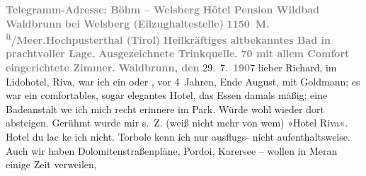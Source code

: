 \begin{ledgroupsized}[t]{13cm}
           \noindent{}{\pb}\textcolor{gray}{\textbf{Telegramm-Adresse: Böhm – Welsberg}}\pend
           \pstart
           \textcolor{gray}{\textbf{Hôtel {\kaufmannsund} Pension Wildbad Waldbrunn}}\pend
           \pstart
           \textcolor{gray}{\textbf{bei Welsberg
                     (Eilzughaltestelle)}}\pend
           \pstart
           \textcolor{gray}{\textbf{1150 M. \textsuperscript{ü}/Meer.\hspace*{1.5em}Hochpusterthal (Tirol)}}\pend
           \pstart
           \textcolor{gray}{\textbf{Heilkräftiges altbekanntes Bad in prachtvoller Lage.}}\pend
           \pstart
           \textcolor{gray}{\textbf{Ausgezeichnete Trinkquelle.}}\pend
           \pstart
           \textcolor{gray}{\textbf{70 mit allem Comfort eingerichtete Zimmer.}}\pend
           \pstart
           \raggedleft{}\textcolor{gray}{\textbf{Waldbrunn, den}}{ }29. 7. \textcolor{gray}{\textbf{190}}7\pend
           \pstart{}lieber Richard,\pend\pstart
           im Lidohotel, Riva, war ich ein oder \label{K_L01695_1v}\label{K_L01695_1h}, vor 4 Jahren, Ende August, mit Goldmann; es war ein comfortables, sogar elegantes Hotel, das Essen damals
               mäßig; eine Badeanstalt we{\geminationn} ich mich recht erinnere im
               Park. Würde wohl wieder dort absteigen. Gerühmt wurde mir s. Z. (weiß nicht mehr von
               wem) »Hotel Riva«. Hotel du lac ke{\geminationn} ich nicht. Torbole kenn ich nur ausflugs- nicht aufenthaltsweise.\pend
           \pstart
           Auch wir haben Dolomitenstraßenpläne, Pordoi, Karersee
               – wollen in Meran einige Zeit verweilen,

\end{ledgroupsized}
